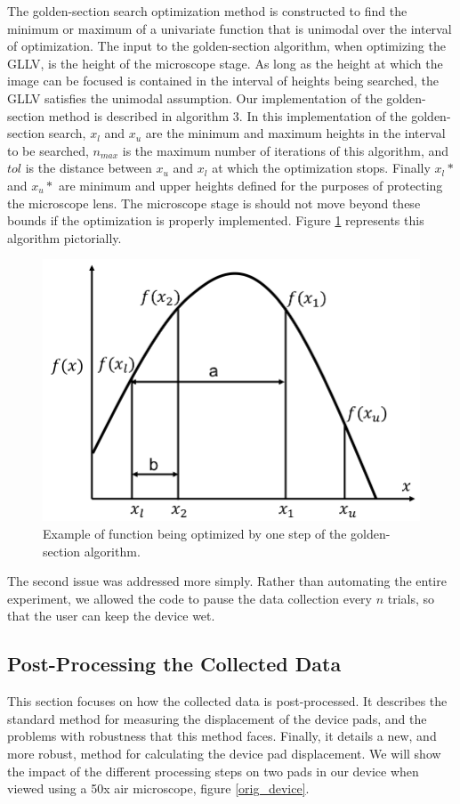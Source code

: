 The golden-section search optimization method is constructed to find the minimum or maximum of a univariate function that is unimodal over the interval of optimization\cite{Nazareth2002}. The input to the golden-section algorithm, when optimizing the GLLV, is the height of the microscope stage. As long as the height at which the image can be focused is contained in the interval of heights being searched, the GLLV satisfies the unimodal assumption. Our implementation of the golden-section method is described in algorithm 3. In this implementation of the golden-section search, $x_l$ and $x_u$ are the minimum and maximum heights in the interval to be searched, $n_{max}$ is the maximum number of iterations of this algorithm, and $tol$ is the distance between $x_u$ and $x_l$ at which the optimization stops. Finally $x_{l}*$ and $x_{u}*$ are minimum and upper heights defined for the purposes of protecting the microscope lens. The microscope stage is should not move beyond these bounds if the optimization is properly implemented. Figure \ref{golden_section_pic} represents this algorithm pictorially.

\begin{figure}[htpb]
    \begin{center}
    \includegraphics[width=0.6\linewidth]{Chapter2/Figs/Raster/golden_section_figure.png}
    \caption{Example of function being optimized by one step of the golden-section algorithm.}\label{golden_section_pic}
    \end{center}
\end{figure}

The second issue was addressed more simply. Rather than automating the entire experiment, we allowed the code to pause the data collection every $n$ trials, so that the user can keep the device wet.

\subsection{Post-Processing the Collected Data}
This section focuses on how the collected data is post-processed. It describes the standard method for measuring the displacement of the device pads, and the problems with robustness that this method faces. Finally, it details a new, and more robust, method for calculating the device pad displacement. We will show the impact of the different processing steps on two pads in our device when viewed using a 50x air microscope, figure \ref{orig_device}.

